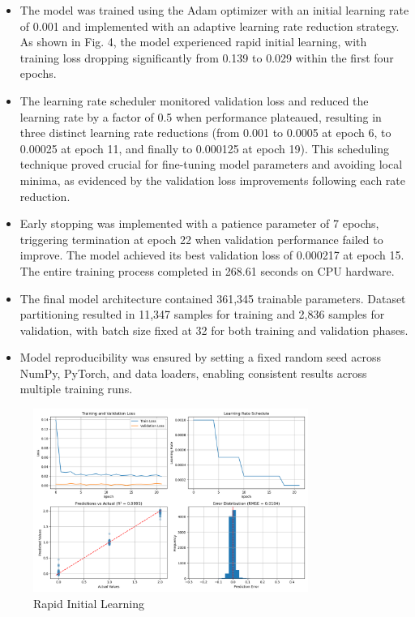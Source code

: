 \documentclass[3p,times,procedia]{elsarticle}
\begin{document}
\begin{itemize}
    \item The model was trained using the Adam optimizer with an initial learning rate of 0.001 and implemented with an adaptive learning rate reduction strategy. As shown in Fig. 4, the model experienced rapid initial learning, with training loss dropping significantly from 0.139 to 0.029 within the first four epochs.
\item The learning rate scheduler monitored validation loss and reduced the learning rate by a factor of 0.5 when performance plateaued, resulting in three distinct learning rate reductions (from 0.001 to 0.0005 at epoch 6, to 0.00025 at epoch 11, and finally to 0.000125 at epoch 19). This scheduling technique proved crucial for fine-tuning model parameters and avoiding local minima, as evidenced by the validation loss improvements following each rate reduction.
\item Early stopping was implemented with a patience parameter of 7 epochs, triggering termination at epoch 22 when validation performance failed to improve. The model achieved its best validation loss of 0.000217 at epoch 15. The entire training process completed in 268.61 seconds on CPU hardware.
\item The final model architecture contained 361,345 trainable parameters. Dataset partitioning resulted in 11,347 samples for training and 2,836 samples for validation, with batch size fixed at 32 for both training and validation phases.
\item Model reproducibility was ensured by setting a fixed random seed across NumPy, PyTorch, and data loaders, enabling consistent results across multiple training runs.
\end{itemize}
\begin{figure}[!ht] %
    \centering
    \includegraphics[width=0.80\textwidth]{Picture2.png} %

    \caption{Rapid Initial Learning}
    \label{fig:learning_curve}
\end{figure}
\end{document}
